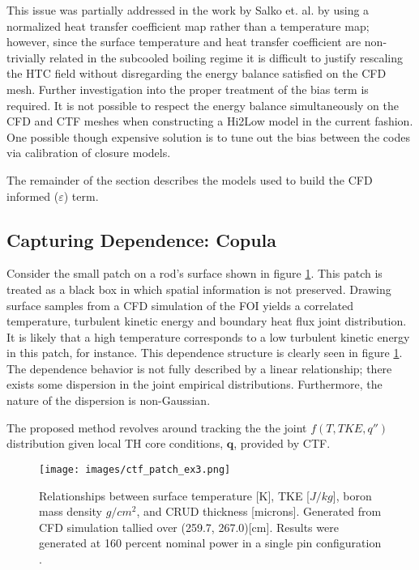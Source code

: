 This issue was partially addressed in the work by Salko et. al. by using a normalized heat transfer coefficient map rather than a temperature map; however, since the surface temperature and heat transfer coefficient are non-trivially related in the subcooled boiling regime it is difficult to justify rescaling the HTC field without disregarding the energy balance satisfied on the CFD mesh.  Further investigation into the proper treatment of the bias term is required.  It is not possible to respect the energy balance simultaneously on the CFD and CTF meshes when constructing a Hi2Low model in the current fashion.  One possible though expensive solution is to tune out the bias between the codes via calibration of closure models.

The remainder of the section describes the models used to build the CFD informed ($\varepsilon$) term.

\subsection{Capturing Dependence: Copula}

Consider the small patch on a rod's surface shown in figure \ref{fig:ctf_patch_dist}.  This patch is treated as a black box in which spatial information is not preserved. Drawing surface samples from a CFD simulation of the FOI yields a correlated temperature, turbulent kinetic energy and boundary heat flux joint distribution.  It is likely that a high temperature corresponds to a low turbulent kinetic energy in this patch, for instance.  This dependence structure is clearly seen in figure \ref{fig:ctf_patch_dist}.  The dependence behavior is not fully described by a linear relationship; there exists some dispersion in the joint empirical distributions.  Furthermore, the nature of the dispersion is non-Gaussian.  

The proposed method revolves around tracking the the joint $f(T, TKE, q'')$ distribution given local TH core conditions, $\mathbf q$, provided by CTF. \\

\begin{figure}[!htbp]
\centering
\texttt{[image: images/ctf\_patch\_ex3.png]}
\caption{Relationships between surface temperature [K], TKE [$J/kg$], boron mass density $g/cm^2$, and CRUD thickness [microns]. Generated from CFD simulation tallied over (259.7, 267.0)[cm]. Results were generated at 160 percent nominal power in a single pin configuration \cite{slattery16}.}
\label{fig:ctf_patch_dist}
\end{figure}

